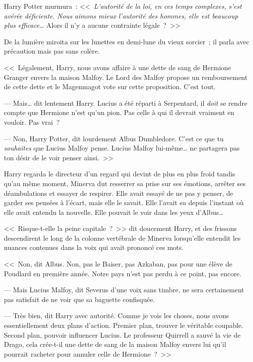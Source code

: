 Harry Potter murmura~: <<~\emph{L'autorité de la loi, en ces temps complexes, s'est avérée déficiente. Nous aimons mieux l'autorité des hommes, elle est beaucoup plus efficace…} Alors il n'y a aucune contrainte légale~?~>>

De la lumière miroita sur les lunettes en demi-lune du vieux sorcier~; il parla avec précaution mais pas sans colère.

<<~Légalement, Harry, nous avons affaire à une dette de sang de Hermione Granger envers la maison Malfoy. Le Lord des Malfoy propose un remboursement de cette dette et le Magenmagot vote sur cette proposition. C'est tout.

--- Mais… dit lentement Harry. Lucius a été réparti à Serpentard, il \emph{doit} se rendre compte que Hermione n'est qu'un pion. Pas celle à qui il devrait vraiment en vouloir. Pas vrai~?

--- Non, Harry Potter, dit lourdement Albus Dumbledore. C'est ce que tu \emph{souhaites} que Lucius Malfoy pense. Lucius Malfoy lui-même… ne partagera pas ton désir de le voir penser ainsi.~>>

Harry regarda le directeur d'un regard qui devint de plus en plus froid tandis qu'au même moment, Minerva dut resserrer sa prise sur ses émotions, arrêter ses déambulations et essayer de respirer. Elle avait essayé de ne pas y penser, de garder ses pensées à l'écart, mais elle le savait. Elle l'avait su depuis l'instant où elle avait entendu la nouvelle. Elle pouvait le voir dans les yeux d'Albus…

<<~Risque-t-elle la peine capitale~?~>> dit doucement Harry, et des frissons descendirent le long de la colonne vertébrale de Minerva lorsqu'elle entendit les nuances contenues dans la voix qui avait prononcé ces mots.

<<~Non, dit Albus. Non, pas le Baiser, pas Azkaban, pas pour une élève de Poudlard en première année. Notre pays n'est pas perdu à ce point, pas encore.

--- Mais Lucius Malfoy, dit Severus d'une voix sans timbre, ne sera certainement pas satisfait de ne voir que sa baguette confisquée.

--- Très bien, dit Harry avec autorité. Comme je vois les choses, nous avons essentiellement deux plans d'action. Premier plan, trouver le véritable coupable. Second plan, pouvoir influencer Lucius. Le professeur Quirrell a sauvé la vie de Drago, cela crée-t-il une dette de sang de la maison Malfoy envers lui qu'il pourrait racheter pour annuler celle de Hermione~?~>>

